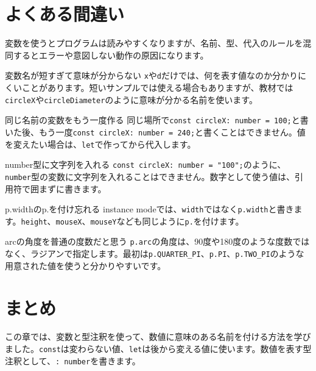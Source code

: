 \section{よくある間違い}

変数を使うとプログラムは読みやすくなりますが、名前、型、代入のルールを混同するとエラーや意図しない動作の原因になります。

\begin{mistakebox}{変数名が短すぎて意味が分からない}
\texttt{x}や\texttt{d}だけでは、何を表す値なのか分かりにくいことがあります。短いサンプルでは使える場合もありますが、教材では\texttt{circleX}や\texttt{circleDiameter}のように意味が分かる名前を使います。
\end{mistakebox}

\begin{mistakebox}{同じ名前の変数をもう一度作る}
同じ場所で\texttt{const circleX: number = 100;}と書いた後、もう一度\texttt{const circleX: number = 240;}と書くことはできません。値を変えたい場合は、\texttt{let}で作ってから代入します。
\end{mistakebox}

\begin{mistakebox}{number型に文字列を入れる}
\texttt{const circleX: number = "100";}のように、\texttt{number}型の変数に文字列を入れることはできません。数字として使う値は、引用符で囲まずに書きます。
\end{mistakebox}

\begin{mistakebox}{p.widthのp.を付け忘れる}
instance modeでは、\texttt{width}ではなく\texttt{p.width}と書きます。\texttt{height}、\texttt{mouseX}、\texttt{mouseY}なども同じように\texttt{p.}を付けます。
\end{mistakebox}

\begin{mistakebox}{arcの角度を普通の度数だと思う}
\texttt{p.arc}の角度は、90度や180度のような度数ではなく、ラジアンで指定します。最初は\texttt{p.QUARTER\_PI}、\texttt{p.PI}、\texttt{p.TWO\_PI}のような用意された値を使うと分かりやすいです。
\end{mistakebox}

\section{まとめ}

この章では、変数と型注釈を使って、数値に意味のある名前を付ける方法を学びました。\texttt{const}は変わらない値、\texttt{let}は後から変える値に使います。数値を表す型注釈として、\texttt{: number}を書きます。

